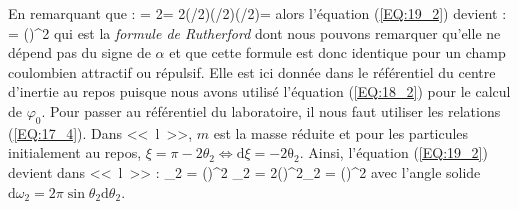 \eea
En remarquant que :
\be
	\omega = 2\pi\sin\xi{}\xi = 2\pi{}\cos(\xi/2)\sin(\xi/2)\xi \Leftrightarrow \pi\cos(\xi/2)\xi = 
\ee
alors l'\'equation (\ref{EQ:19_2}) devient :
\be
	\sigma = \left(\right)^{2} \label{EQ:19_3}
\ee
qui est la \emph{formule de Rutherford} dont nous pouvons remarquer qu'elle ne d\'epend pas du signe de $\alpha$ et que cette formule est donc identique pour un champ coulombien attractif ou r\'epulsif. Elle est ici donn\'ee dans le r\'ef\'erentiel du centre d'inertie au repos puisque nous avons utilis\'e l'\'equation (\ref{EQ:18_2}) pour le calcul de $\varphi_{0}$. Pour passer au r\'ef\'erentiel du laboratoire, il nous faut utiliser les relations (\ref{EQ:17_4}). Dans <<~l~>>, $m$ est la masse r\'eduite et pour les particules initialement au repos, $\xi = \pi - 2\theta_{2} \Leftrightarrow \mathrm{d}\xi = -2\mathrm{\theta_{2}}$. Ainsi, l'\'equation (\ref{EQ:19_2}) devient dans <<~l~>> :
\be
	\sigma_{2} = \pi\left(\right)^{2} \rvert {}\theta_{2} = 2\pi\left(\right)^{2}\theta_{2} = \left(\right)^{2} \label{EQ:19_4}
\ee
avec l'angle solide $\mathrm{d}\omega_{2} = 2\pi\sin\theta_{2}\mathrm{d}\theta_{2}$.

